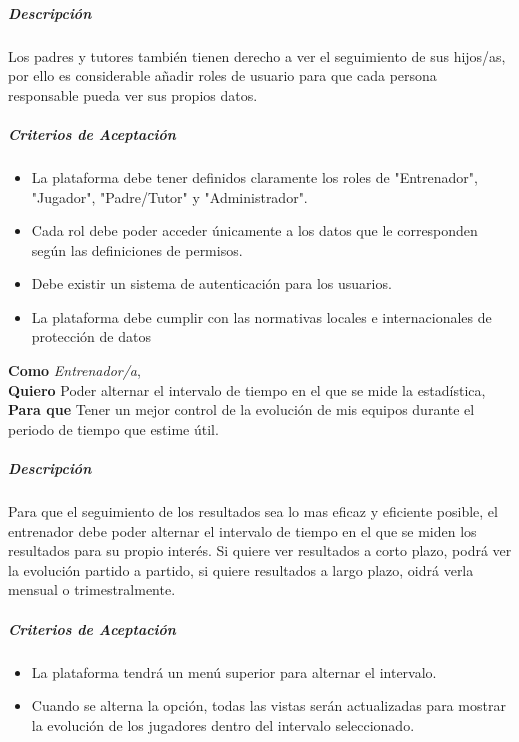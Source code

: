 \subparagraph{Descripción}
Los padres y tutores también tienen derecho a ver el seguimiento de sus hijos/as, por ello es considerable añadir roles de usuario para que cada persona responsable pueda ver sus propios datos.

\subparagraph{Criterios de Aceptación}
\begin{itemize}
    \item La plataforma debe tener definidos claramente los roles de "Entrenador", "Jugador", "Padre/Tutor" y "Administrador".
    \item Cada rol debe poder acceder únicamente a los datos que le corresponden según las definiciones de permisos.
    \item Debe existir un sistema de autenticación para los usuarios.
    \item La plataforma debe cumplir con las normativas locales e internacionales de protección de datos
\end{itemize}

\begin{tcolorbox}[title=Historia de Usuario: Intervalos Estadísticos para el menú]
\textbf{Como} \textit{Entrenador/a},\\
\textbf{Quiero} Poder alternar el intervalo de tiempo en el que se mide la estadística,\\
\textbf{Para que} Tener un mejor control de la evolución de mis equipos durante el periodo de tiempo que estime útil.
\end{tcolorbox}

\subparagraph{Descripción}
Para que el seguimiento de los resultados sea lo mas eficaz y eficiente posible, el entrenador debe poder alternar el intervalo de tiempo en el que se miden los resultados para su propio interés. Si quiere ver resultados a corto plazo, podrá ver la evolución partido a partido, si quiere resultados a largo plazo, oidrá verla mensual o trimestralmente.

\subparagraph{Criterios de Aceptación}
\begin{itemize}
    \item La plataforma tendrá un menú superior para alternar el intervalo.
    \item Cuando se alterna la opción, todas las vistas serán actualizadas para mostrar la evolución de los jugadores dentro del intervalo seleccionado.
\end{itemize}


